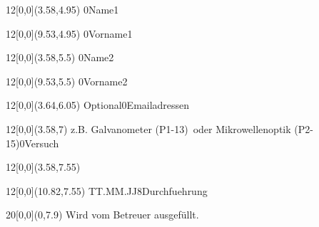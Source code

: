 \begin{titlepage}
    \begin{textblock}{12}[0,0](3.58,4.95)
                    {}{0}{Name1}
    \end{textblock}
    \begin{textblock}{12}[0,0](9.53,4.95)
                    {}{0}{Vorname1}
    \end{textblock}

    \begin{textblock}{12}[0,0](3.58,5.5)
                    {}{0}{Name2}
    \end{textblock}
    \begin{textblock}{12}[0,0](9.53,5.5)
                    {}{0}{Vorname2}
    \end{textblock}

    \begin{textblock}{12}[0,0](3.64,6.05)
       \normalsize{}
                              {Optional}{0}{Emailadressen}
    \end{textblock}

    \begin{textblock}{12}[0,0](3.58,7)
                    {z.B. \glqq Galvanometer (P1-13)\grqq\ oder \glqq %
                     Mikrowellenoptik (P2-15)\grqq}{0}{Versuch}
    \end{textblock}

    \begin{textblock}{12}[0,0](3.58,7.55)
    \end{textblock}
    \begin{textblock}{12}[0,0](10.82,7.55)
                    {TT.MM.JJ}{8}{Durchfuehrung}
    \end{textblock}

    \begin{textblock}{20}[0,0](0,7.9)\tiny\centering
        Wird vom Betreuer ausgefüllt.
    \end{textblock}


\end{titlepage}
